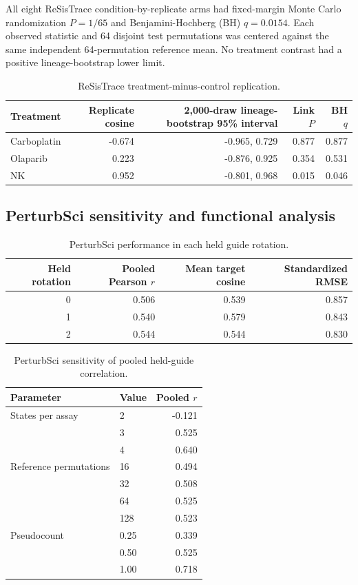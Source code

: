 \documentclass[10pt,a4paper]{article}
\begin{document}
All eight ReSisTrace condition-by-replicate arms had fixed-margin Monte Carlo randomization $P=1/65$ and Benjamini-Hochberg (BH) $q=0.0154$. Each observed statistic and 64 disjoint test permutations was centered against the same independent 64-permutation reference mean. No treatment contrast had a positive lineage-bootstrap lower limit.

\begin{table}[ht]
\centering
\caption{ReSisTrace treatment-minus-control replication.}
\label{tab:s-resis}
\begin{tabular}{lrrrr}
\toprule
Treatment & Replicate cosine & 2,000-draw lineage-bootstrap 95\% interval & Link $P$ & BH $q$ \\
\midrule
Carboplatin & -0.674 & -0.965, 0.729 & 0.877 & 0.877 \\
Olaparib & 0.223 & -0.876, 0.925 & 0.354 & 0.531 \\
NK & 0.952 & -0.801, 0.968 & 0.015 & 0.046 \\
\bottomrule
\end{tabular}
\end{table}

\FloatBarrier
\subsection{PerturbSci sensitivity and functional analysis}

\begin{table}[H]
\centering
\caption{PerturbSci performance in each held guide rotation.}
\label{tab:s-perturbsci-folds}
\begin{tabular}{rrrr}
\toprule
Held rotation & Pooled Pearson $r$ & Mean target cosine & Standardized RMSE \\
\midrule
0 & 0.506 & 0.539 & 0.857 \\
1 & 0.540 & 0.579 & 0.843 \\
2 & 0.544 & 0.544 & 0.830 \\
\bottomrule
\end{tabular}
\end{table}

\begin{table}[H]
\centering
\caption{PerturbSci sensitivity of pooled held-guide correlation.}
\label{tab:s-sensitivity}
\begin{tabular}{llr}
\toprule
Parameter & Value & Pooled $r$ \\
\midrule
States per assay & 2 & -0.121 \\
 & 3 & 0.525 \\
 & 4 & 0.640 \\
Reference permutations & 16 & 0.494 \\
 & 32 & 0.508 \\
 & 64 & 0.525 \\
 & 128 & 0.523 \\
Pseudocount & 0.25 & 0.339 \\
 & 0.50 & 0.525 \\
 & 1.00 & 0.718 \\
\bottomrule
\end{tabular}
\end{table}
\end{document}
